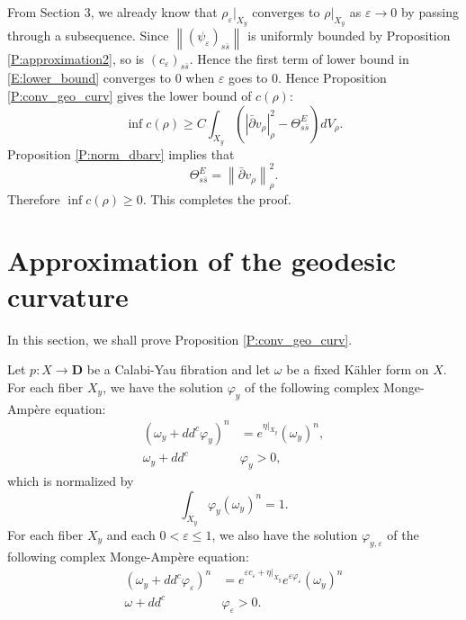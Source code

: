 \documentclass{amsart}
\theoremstyle{definition}
\numberwithin{equation}{section}
\begin{document}
From Section 3, we already know that $\rho_{\varepsilon}\vert_{X_y}$ converges to $\rho\vert_{X_y}$ as ${\varepsilon}\rightarrow0$ by passing through a subsequence. 
Since ${\left\|{(\psi_{\varepsilon})_{s\bar s}}\right\|}$ is uniformly bounded by Proposition \ref{P:approximation2}, so is $(c_{\varepsilon})_{s\bar s}$. 
Hence the first term of lower bound in \eqref{E:lower_bound} converges to $0$ when ${\varepsilon}$ goes to $0$. 
Hence Proposition \ref{P:conv_geo_curv} gives the lower bound of $c(\rho)$:
\begin{equation}\label{E:lower_bound}
\inf c(\rho)
\ge
C\int_{X_y}
{\left({
		{\left\vert{\bar\partial v_\rho}\right\vert}_{\rho}^2
		-\Theta^E_{s\bar s}
}\right)}
dV_\rho.
\end{equation}
Proposition \ref{P:norm_dbarv} implies that
\begin{equation*}
\Theta^E_{s\bar s}
=
{\left\|{\bar\partial v_\rho}\right\|}_{\rho}^2.
\end{equation*}
Therefore $\inf c(\rho)\ge0$. 
This completes the proof.

\section{Approximation of the geodesic curvature}\label{S:app_geo_curv}

In this section, we shall prove Proposition \ref{P:conv_geo_curv}.

Let $p:X\rightarrow{\mathbf{D}}$ be a Calabi-Yau fibration and let $\omega$ be a fixed K\"ahler form on $X$. For each fiber $X_y$, we have the solution ${\varphi}_y$ of the following complex Monge-Amp\`ere equation:
\begin{equation}\label{E:CMAE0'}
\begin{aligned}
{\left({\omega_y+dd^c\varphi_y}\right)}^n &= e^{\eta\vert_{X_y}}(\omega_y)^n, \\
\omega_y+dd^c&\varphi_y>0,
\end{aligned}
\end{equation}
which is normalized by 
\begin{equation}\label{E:normalization}
\int_{X_y}\varphi_y(\omega_y)^n=1.
\end{equation}
For each fiber $X_y$ and each $0<{\varepsilon}\le1$, we also have the solution ${\varphi}_{y,{\varepsilon}}$ of the following complex Monge-Amp\`ere equation:
\begin{equation}\label{E:CMAE1'}
\begin{aligned}
{\left({\omega_y+dd^c{\varphi}_{\varepsilon}}\right)}^n &= 
e^{{\varepsilon} c_{\varepsilon}+\eta\vert_{X_y}}e^{{\varepsilon}{\varphi}_{\varepsilon}}(\omega_y)^n \\
\omega+dd^c&{\varphi}_{\varepsilon}>0.
\end{aligned}
\end{equation}
\end{document}
